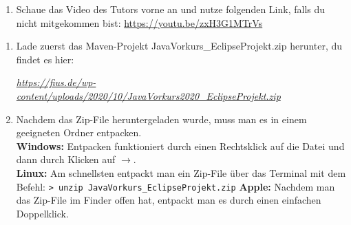 

\newcommand{\jvkpackage}{JavaVorkurs\_EclipseProjekt.zip}
\newcommand{\jvkpackageurl}{https://fius.de/wp-content/uploads/2020/10/JavaVorkurs2020\_EclipseProjekt.zip} %


\begin{Infobox}
    \begin{enumerate}[label=\arabic*.]
        \item Schaue das Video des Tutors vorne an und nutze folgenden Link, falls du nicht mitgekommen bist:
        \color{blue}\url{https://youtu.be/zxH3G1MTrVs}
    \end{enumerate}
\end{Infobox}

\begin{Infobox}
    \begin{enumerate}[label=\arabic*.]
        \item Lade zuerst das Maven-Projekt \jvkpackage { } herunter, du findet es hier:
        \begin{center}
            \color{blue}\href{\jvkpackageurl}{\textit{\jvkpackageurl}}
        \end{center}

        \item Nachdem das Zip-File heruntergeladen wurde, muss man es in einem geeigneten Ordner entpacken.\\
        \textbf{Windows:} Entpacken funktioniert durch einen Rechtsklick auf die Datei und dann durch Klicken auf $\to$.\\
        \textbf{Linux:} Am schnellsten entpackt man ein Zip-File über das Terminal mit dem Befehl:
        \newline\hspace*{\fill}\texttt{\textgreater\ unzip \jvkpackage}\hspace*{\fill}\newline
        \textbf{Apple:} Nachdem man das Zip-File im Finder offen hat, entpackt man es durch einen einfachen Doppelklick.
    \end{enumerate}
\end{Infobox}


